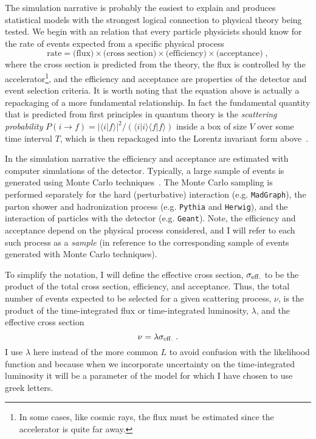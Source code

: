The simulation narrative is probably the easiest to explain and produces statistical models with the strongest logical connection to physical theory being tested.  We begin with an relation that every particle physicists should know for the rate of events expected from a specific physical process
\begin{equation}
\textrm{rate} = \textrm{(flux)} \times \textrm{(cross section)}  \times\textrm{(efficiency)}  \times \textrm{(acceptance)} \;,
\end{equation}
where the cross section is predicted from the theory, the flux is controlled by the accelerator\footnote{In some cases, like cosmic rays, the flux must be estimated since the accelerator is quite far away.}, and the efficiency and acceptance are properties of the detector and event selection criteria.  It is worth noting that the equation above is actually a repackaging of a more fundamental relationship. In fact the fundamental quantity that is predicted from first principles in quantum theory is the  \textit{scattering probability}  \mbox{$P(i\to f)=|\langle i|f\rangle|^2/ (\langle i|i\rangle\langle f | f \rangle)$} inside a box of size $V$ over some time interval $T$, which is then repackaged into the Lorentz invariant form above~\cite{Sredniki}.


In the simulation narrative the efficiency and acceptance are estimated with computer simulations of the detector.  Typically, a large sample of events is generated using Monte Carlo techniques~\cite{MonteCarlo}.  The Monte Carlo sampling is performed separately  for the hard (perturbative) interaction (e.g. \texttt{MadGraph}), the parton shower and hadronization process (e.g. \texttt{Pythia} and \texttt{Herwig}), and the interaction of particles with the detector (e.g. \texttt{Geant}).  Note, the efficiency and acceptance depend on the physical process considered, and I will refer to each such process as a \textit{sample} (in reference to the corresponding sample of events generated with Monte Carlo techniques).


To simplify the notation, I will define the effective cross section, $\sigma_{\rm eff.}$ to be the product of the total cross section, efficiency, and acceptance.  Thus, the total number of events expected to be selected for a given scattering process, $\nu$, is the product of the time-integrated flux or time-integrated luminosity, $\lambda$, and the effective cross section
\begin{equation}
\nu = \lambda \sigma_{\rm eff.}\;.
\end{equation}
I use $\lambda$ here instead of the more common $L$ to avoid confusion with the likelihood function and because when we incorporate uncertainty on the time-integrated luminosity it will be a parameter of the model for which I have chosen to use greek letters.  


